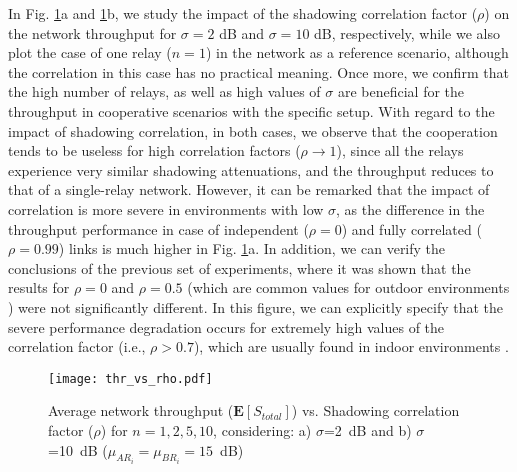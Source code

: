 \documentclass[12pt,draftcls, onecolumn]{IEEEtran}
\begin{document}
In Fig. \ref{th2}a and \ref{th2}b, we study the impact of the shadowing correlation factor ($\rho$) on the network throughput for $\sigma=2$ dB and $\sigma=10$ dB, respectively, while we also plot the case of one relay ($n=1$) in the network as a reference scenario, although the correlation in this case has no practical meaning. Once more, we confirm that the high number of relays, as well as high values of $\sigma$ are beneficial for the throughput in cooperative scenarios with the specific setup. With regard to the impact of shadowing correlation, in both cases, we observe that the cooperation tends to be useless for high correlation factors ($\rho\rightarrow 1$), since all the relays experience very similar shadowing attenuations, and the throughput reduces to that of a single-relay network. However, it can be remarked that the impact of correlation is more severe in environments with low $\sigma$, as the difference in the throughput performance in case of independent ($\rho=0$) and fully correlated ($\rho=0.99$) links is much higher in Fig. \ref{th2}a. In addition, we can verify the conclusions of the previous set of experiments, where it was shown that the results for $\rho=0$ and $\rho=0.5$ (which are common values for outdoor environments \cite{out_cor}) were not significantly different. In this figure, we can explicitly specify that the severe performance degradation occurs for extremely high values of the correlation factor (i.e., $\rho>0.7$), which are usually found in indoor environments \cite{in_cor1,in_cor2}.

\begin{figure}[htb]
\centering
\texttt{[image: thr\_vs\_rho.pdf]}
\caption{Average network throughput ($\mathbf{E}[S_{total}]$) vs. Shadowing correlation factor ($\rho$) for $n=1,2,5,10$, considering: a) $\sigma$=2~dB and b) $\sigma$=10~dB ($\mu_{AR_i}=\mu_{BR_i}=15$~dB)}\label{th2}
\end{figure}
\end{document}
